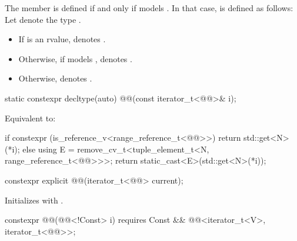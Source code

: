 \pnum
The member   is defined
if and only if  models .
In that case,  is defined as follows:
Let  denote the type
.
\begin{itemize}
\item
If  is an rvalue,
 denotes .
\item
Otherwise, if  models ,
 denotes .
\item
Otherwise,  denotes .
\end{itemize}

\begin{itemdecl}
static constexpr decltype(auto) @@(const iterator_t<@@>& i);
\end{itemdecl}

\begin{itemdescr}
\pnum
\effects
Equivalent to:
\begin{codeblock}
if constexpr (is_reference_v<range_reference_t<@@>>) {
  return std::get<N>(*i);
} else {
  using E = remove_cv_t<tuple_element_t<N, range_reference_t<@@>>>;
  return static_cast<E>(std::get<N>(*i));
}
\end{codeblock}
\end{itemdescr}

%
\begin{itemdecl}
constexpr explicit @@(iterator_t<@@> current);
\end{itemdecl}

\begin{itemdescr}
\pnum
\effects
Initializes  with .
\end{itemdescr}

%
\begin{itemdecl}
constexpr @@(@@<!Const> i)
  requires Const && @@<iterator_t<V>, iterator_t<@@>>;
\end{itemdecl}

